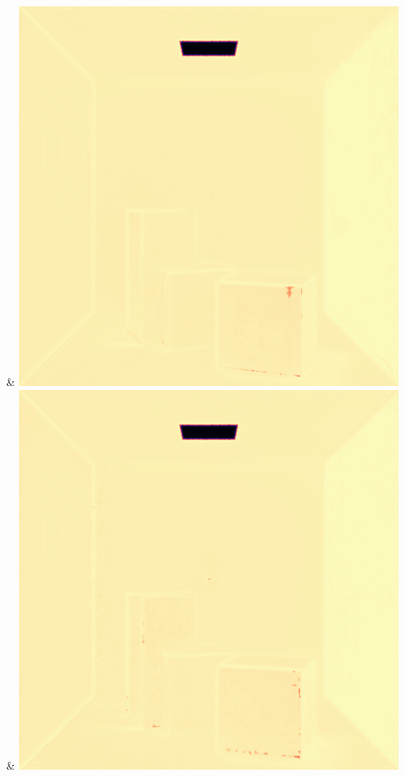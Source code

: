 & \includegraphics[width=\linewidth]{figures/py/tests/quality_comparison/nrc+lt+bal_1spp_diffuse_flip.png}
& \includegraphics[width=\linewidth]{figures/py/tests/quality_comparison/nrc+lt+balcam_1spp_diffuse_flip.png}
